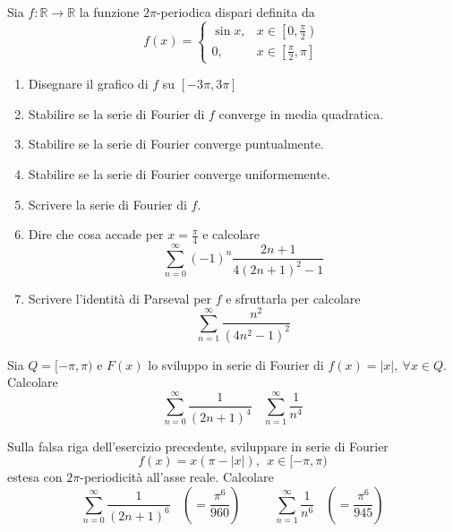 Sia $f:\mathbb{R}\rightarrow \mathbb{R}$ la funzione $2\pi $-periodica dispari definita da
\begin{equation*}
f( x) =\begin{cases}
\sin x, & x\in \left[ 0,\frac{\pi }{2}\right)\\
0, & x\in \left[\frac{\pi }{2} ,\pi \right]
\end{cases}
\end{equation*}
\begin{enumerate}
\item Disegnare il grafico di $f$ su $[ -3\pi ,3\pi ]$
\item Stabilire se la serie di Fourier di $f$ converge in media quadratica.
\item Stabilire se la serie di Fourier converge puntualmente.
\item Stabilire se la serie di Fourier converge uniformemente.
\item Scrivere la serie di Fourier di $f$.
\item Dire che cosa accade per $x=\frac{\pi }{4}$ e calcolare\begin{equation*}
\sum\limits ^{\infty }_{n=0}( -1)^{n}\frac{2n+1}{4( 2n+1)^{2} -1}
\end{equation*}
\item Scrivere l'identità di Parseval per $f$ e sfruttarla per calcolare\begin{equation*}
\sum\limits ^{\infty }_{n=1}\frac{n^{2}}{\left( 4n^{2} -1\right)^{2}}
\end{equation*}
\end{enumerate}
\Esercizio{}

Sia $Q=[ -\pi ,\pi )$ e $F( x)$ lo sviluppo in serie di Fourier di $f( x) =| x| ,\ \forall x\in Q$. Calcolare
\begin{equation*}
\sum\limits ^{\infty }_{n=0}\frac{1}{( 2n+1)^{4}} \ \ \ \ \sum\limits ^{\infty }_{n=1}\frac{1}{n^{4}}
\end{equation*}
\Esercizio{}

Sulla falsa riga dell'esercizio precedente, sviluppare in serie di Fourier
\begin{equation*}
f( x) =x( \pi -| x| ) ,\ \ x\in [ -\pi ,\pi )
\end{equation*}
estesa con $2\pi $-periodicità all'asse reale. Calcolare
\begin{equation*}
\sum\limits ^{\infty }_{n=0}\frac{1}{( 2n+1)^{6}} \ \ \ \ \left( =\frac{\pi ^{6}}{960}\right) \ \ \ \ \ \ \ \ \ \ \ \ \sum\limits ^{\infty }_{n=1}\frac{1}{n^{6}} \ \ \ \ \left( =\frac{\pi ^{6}}{945}\right)
\end{equation*}
\Esercizio{}


